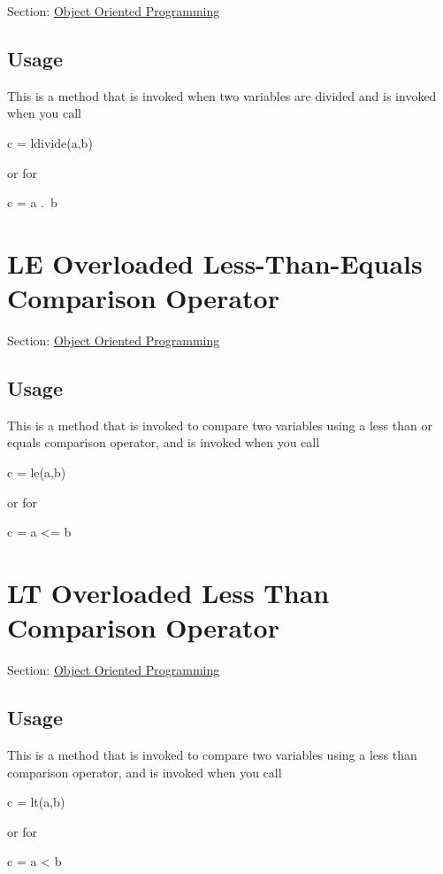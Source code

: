 Section\-: \hyperlink{sec_class}{Object Oriented Programming} \hypertarget{vtkwidgets_vtkxyplotwidget_Usage}{}\subsection{Usage}\label{vtkwidgets_vtkxyplotwidget_Usage}
This is a method that is invoked when two variables are divided and is invoked when you call \begin{DoxyVerb}   c = ldivide(a,b)
\end{DoxyVerb}
 or for \begin{DoxyVerb}   c = a .\ b
\end{DoxyVerb}
 \hypertarget{class_le}{}\section{L\-E Overloaded Less-\/\-Than-\/\-Equals Comparison Operator}\label{class_le}
Section\-: \hyperlink{sec_class}{Object Oriented Programming} \hypertarget{vtkwidgets_vtkxyplotwidget_Usage}{}\subsection{Usage}\label{vtkwidgets_vtkxyplotwidget_Usage}
This is a method that is invoked to compare two variables using a less than or equals comparison operator, and is invoked when you call \begin{DoxyVerb}   c = le(a,b)
\end{DoxyVerb}
 or for \begin{DoxyVerb}   c = a <= b
\end{DoxyVerb}
 \hypertarget{class_lt}{}\section{L\-T Overloaded Less Than Comparison Operator}\label{class_lt}
Section\-: \hyperlink{sec_class}{Object Oriented Programming} \hypertarget{vtkwidgets_vtkxyplotwidget_Usage}{}\subsection{Usage}\label{vtkwidgets_vtkxyplotwidget_Usage}
This is a method that is invoked to compare two variables using a less than comparison operator, and is invoked when you call \begin{DoxyVerb}   c = lt(a,b)
\end{DoxyVerb}
 or for \begin{DoxyVerb}   c = a < b
\end{DoxyVerb}
